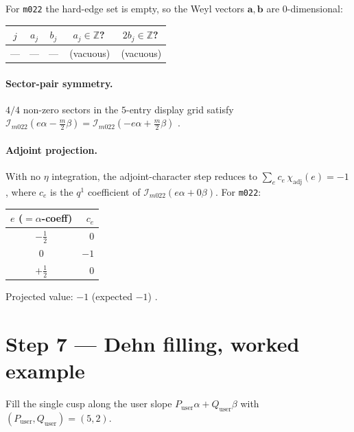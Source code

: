 \documentclass[11pt,a4paper]{article}
\renewcommand{\Im}{\mathcal{I}_{m022}}                %
\newcommand{\pass}{{\color{green!55!black}\ding{51}}}
\begin{document}
For \texttt{m022} the hard-edge set is empty, so the Weyl vectors
\(\mathbf{a}, \mathbf{b}\) are \(0\)-dimensional:
\begin{center}
\begin{tabular}{c c c c c}
\toprule
\(j\) & \(a_j\) & \(b_j\) & \(a_j\in\mathbb{Z}\)? &
                    \(2b_j\in\mathbb{Z}\)? \\
\midrule
--- & --- & --- & \pass\,(vacuous) & \pass\,(vacuous) \\
\bottomrule
\end{tabular}
\end{center}

\paragraph{Sector-pair symmetry.}
\(4/4\) non-zero sectors in the \(5\)-entry display grid satisfy
\(\Im(e\alpha-\tfrac{m}{2}\beta) = \Im(-e\alpha+\tfrac{m}{2}\beta)\)
\pass.

\paragraph{Adjoint projection.}
With no \(\eta\) integration, the adjoint-character step reduces to
\(\sum_e c_e\,\chi_{\text{adj}}(e) = -1\), where \(c_e\) is the
\(q^{1}\) coefficient of \(\Im\!\left(e\alpha + 0\beta\right)\).
For \texttt{m022}:
\begin{center}
\begin{tabular}{c r}
\toprule
\(e\) (\(=\alpha\)-coeff) & \(c_e\) \\
\midrule
\(-\tfrac12\) & \(0\) \\
\(0\)         & \(-1\) \\
\(+\tfrac12\) & \(0\) \\
\bottomrule
\end{tabular}
\end{center}
Projected value: \(-1\) \;(expected \(-1\)) \;\pass.

\section{Step 7 --- Dehn filling, worked example}

Fill the single cusp along the user slope \(P_{\text{user}}\alpha +
Q_{\text{user}}\beta\) with \((P_{\text{user}}, Q_{\text{user}}) = (5, 2)\).
\end{document}
